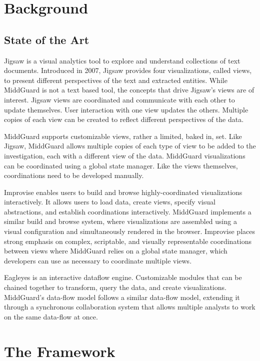 \documentclass[midd]{thesis}
\begin{document}
\chapter{Background}

\section{State of the Art}

Jigsaw \cite{Stasko:2008:JSI:1466620.1466622} is a visual analytics tool to
explore and understand collections of text documents. Introduced in 2007, Jigsaw
provides four visualizations, called views, to present different perspectives of
the text and extracted entities. While MiddGuard is not a text based tool, the
concepts that drive Jigsaw's views are of interest. Jigsaw views are coordinated
and communicate with each other to update themselves. User interaction with one
view updates the others. Multiple copies of each view can be created to reflect
different perspectives of the data.

MiddGuard supports customizable views, rather a limited, baked in, set. Like
Jigsaw, MiddGuard allows multiple copies of each type of view to be added to the
investigation, each with a different view of the data. MiddGuard visualizations
can be coordinated using a global state manager. Like the views themselves,
coordinations need to be developed manually.

Improvise \cite{weaver-2004a} enables users to build and browse
highly-coordinated visualizations interactively. It allows users to load data,
create views, specify visual abstractions, and establish coordinations
interactively. MiddGuard implements a similar build and browse system, where
visualizations are assembled using a visual configuration and simultaneously
rendered in the browser. Improvise places strong emphasis on complex,
scriptable, and visually representable coordinations between views where
MiddGuard relies on a global state manager, which developers can use as
necessary to coordinate multiple views.

Eagleyes \cite{7347662} is an interactive dataflow engine. Customizable
modules that can be chained together to transform, query the data, and create
visualizations. MiddGuard's data-flow model follows a similar data-flow model,
extending it through a synchronous collaboration system that allows multiple
analysts to work on the same data-flow at once.

\chapter{The Framework}
\end{document}
